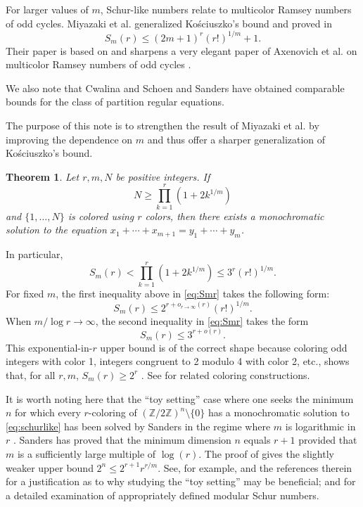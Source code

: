 \documentclass[11pt]{article}
\theoremstyle{plain}
\newtheorem{theorem}{Theorem}
\theoremstyle{definition}
\theoremstyle{definition}
\theoremstyle{remark}
\newcommand{\Z}{\mathbb{Z}}
\begin{document}
For larger values of $m$, Schur-like numbers relate to multicolor Ramsey numbers of odd cycles. Miyazaki et al. generalized Ko\'sciuszko's bound and proved in \cite{MMPZ2026}
\[
S_m(r) \le (2m + 1)^r(r!)^{1/m} + 1.
\]
Their paper is based on and sharpens a very elegant paper of Axenovich et al. on multicolor Ramsey numbers of odd cycles \cite{ACJMR2026}.

We also note that Cwalina and Schoen \cite{Cwalina-Schoen2017} and Sanders \cite{Sanders2026a} have obtained comparable bounds for the class of partition regular equations.  

The purpose of this note is to strengthen the result of Miyazaki et al. by improving the dependence on $m$ and thus offer a sharper generalization of Ko\'sciuszko's bound. 


\begin{theorem} \label{thm:schurlike}
    Let $r, m, N$ be positive integers. If 
    \[
    N \ge \prod_{k=1}^r (1 + 2 k^{1/m})
    \]
    and $\{1, \dots, N\}$ is colored using $r$ colors, then there exists a monochromatic solution to the equation $x_1+\cdots+x_{m+1}=y_1+\cdots+y_m$.
\end{theorem}

In particular,
\begin{equation} \label{eq:Smr}
S_m(r) < \prod_{k=1}^r (1 + 2 k^{1/m}) \le 3^r (r!)^{1/m}.
\end{equation}
For fixed $m$, the first inequality above in \eqref{eq:Smr} takes the following form:
\[
S_m(r) \leq 2^{r + o_{r \to \infty}(r)} (r!)^{1/m}.
\]
When $m / \log r \to \infty$, the second inequality in \eqref{eq:Smr} takes the form
\[
S_m(r) \leq 3^{r+o(r)}.
\]
This exponential-in-$r$ upper bound is of the correct shape because coloring odd integers with color 1, integers congruent to 2 modulo 4 with color 2, etc., shows that, for all $r, m$, $S_m(r) \geq 2^r$ \cite{MMPZ2026}. See \cite{Fox-Kleitman2006} for related coloring constructions.

It is worth noting here that the ``toy setting'' case where one seeks the minimum $n$ for which every $r$-coloring of $(\Z/2\Z)^n \setminus \{0\}$ has a monochromatic solution to \eqref{eq:schurlike} has been solved by Sanders in the regime where $m$ is logarithmic in $r$ \cite{Sanders-personal}. Sanders has proved that the minimum dimension $n$ equals $r+1$ provided that $m$ is a sufficiently large multiple of $\log(r)$. The proof of \cite[Theorem 1.2]{ACJMR2026} gives the slightly weaker upper bound $2^n \leq 2^{r+1} r^{r/m}$. See, for example, \cite[Section 2]{Sanders2026a} and the references therein for a justification as to why studying the ``toy setting'' may be beneficial; and \cite{Abbott-Hanson1972,Heule2018,Sanders2026b} for a detailed examination of appropriately defined modular Schur numbers. 
\end{document}
